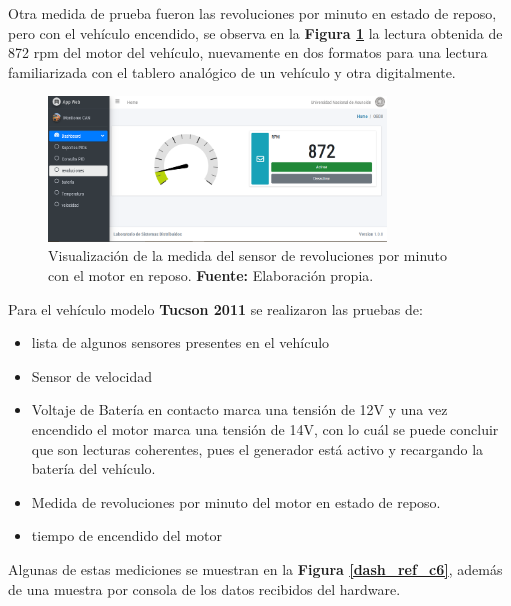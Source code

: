 Otra medida de prueba fueron las revoluciones por minuto en estado de reposo, pero con el vehículo encendido, se observa en la \textbf{Figura \ref{rpm_ref_c6}} la lectura obtenida de 872 rpm del motor del vehículo, nuevamente en dos formatos para una lectura familiarizada con el tablero analógico de un vehículo y otra digitalmente. 

\begin{figure}[H]
	\centering
	\includegraphics[width=0.8\textwidth]{./Cap6imagen/rpm_fig_c6.png}
	\caption [Visualización de la medida del sensor de revoluciones por minuto con el motor en reposo.]{Visualización de la medida del sensor de revoluciones por minuto con el motor en reposo.  \textbf{ Fuente:} %
		Elaboración propia.}
	\label{rpm_ref_c6} %
\end{figure}


Para el vehículo modelo \textbf{Tucson 2011} se realizaron las pruebas de: 


\begin{itemize}
    \item lista de algunos sensores presentes en el vehículo
    \item Sensor de velocidad
    \item Voltaje de Batería en contacto marca una tensión de 12V y una vez encendido el motor marca una tensión de 14V, con lo cuál se puede concluir que son lecturas coherentes, pues el generador está activo y recargando la batería del vehículo. 
    \item Medida de revoluciones por minuto del motor en estado de reposo. 
    \item tiempo de encendido del motor
\end{itemize}

Algunas de estas  mediciones se muestran en la \textbf{Figura \ref{dash_ref_c6}}, además de una muestra por consola de los datos recibidos del hardware. 

